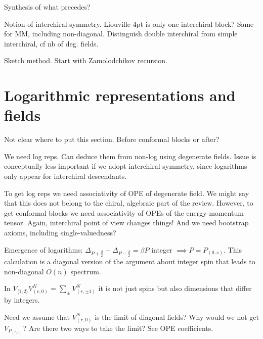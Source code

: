 \documentclass[12pt, a4paper]{article}
\theoremstyle{break}
\begin{document}
Synthesis of what precedes?

Notion of interchiral symmetry. Liouville 4pt is only one interchiral block? Same for MM, including non-diagonal. Distinguish double interchiral from simple interchiral, cf nb of deg. fields. 

Sketch method. Start with Zamolodchikov recursion.


\section{Logarithmic representations and fields} \label{sec:log}

Not clear where to put this section. Before conformal blocks or after?

We need log reps. Can deduce them from non-log using degenerate fields. Issue is conceptually less important if we adopt interchiral symmetry, since logarithms only appear for interchiral descendants. 

To get log reps we need associativity of OPE of degenerate field. We might say that this does not belong to the chiral, algebraic part of the review. However, to get conformal blocks we need associativity of OPEs of the energy-momentum tensor. Again, interchiral point of view changes things! And we need bootstrap axioms, including single-valuedness? 

Emergence of logarithms: $\Delta_{P+\frac{\beta}{2}}-\Delta_{P-\frac{\beta}{2}} = \beta P$ integer $\implies P=P_{(0,s)}$. This calculation is a diagonal version of the argument about integer spin that leads to non-diagonal $O(n)$ spectrum.

In $V_{\langle 1,2\rangle}V^N_{(r,0)} = \sum_\pm V^N_{(r,\pm 1)}$ it is not just spins but also dimensions that differ by integers. 

Need we assume that $V^N_{(r,0)}$ is the limit of diagonal fields? Why would we not get $V_{P_{(r,0)}}$? Are there two ways to take the limit? See OPE coefficients. 




%
\end{document}
